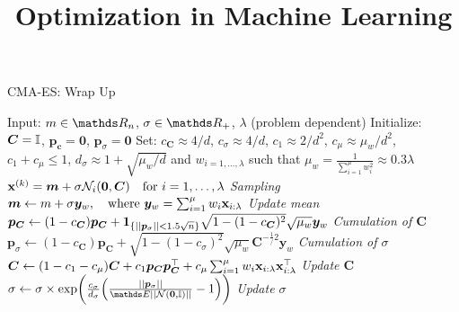 \documentclass[11pt,compress,t,notes=noshow, xcolor=table]{beamer}
\title{Optimization in Machine Learning}
\date{}
\begin{document}
\sloppy


\begin{vbframe}{CMA-ES: Wrap Up}

\begin{algorithm}[H]
  \begin{footnotesize}
  \begin{center}
  \caption{CMA-ES}
    \begin{algorithmic}[1]
    \State Input: $m \in \R_n$, $\sigma \in \R_+$, $\lambda$ (problem dependent)
    \State Initialize: $\bm{C} = \bm{\mathbb{I}}$, $\bm{p}_{\bm{c}} = \bm{0}$, $\bm{p}_{\sigma} = \bm{0}$
    \State Set: $c_{\bm{C}} \approx 4/d$, $c_{\sigma} \approx 4/d$, $c_1 \approx 2/d^2$, $c_{\mu} \approx \mu_w/d^2$, $c_1+c_{\mu} \leq 1$, $d_{\sigma} \approx 1+\sqrt{\mu_w/d}$ and $w_{i=1,\dots, \lambda}$ such that $\mu_w = \frac{1}{\sum_{i=1}^{\mu} w_i^2} \approx 0.3 \lambda$
      \State $\mathbf{x}^{(k)} = \bm{m} + \sigma \mathcal{N}_i(\bm{0}, \bm{C}) \quad \text{for } i=1,\dots, \lambda$ \quad \textit{Sampling}
      \State $\bm{m} \leftarrow m + \sigma \bm{y}_w, \quad \text{where } \bm{y}_w = \sum_{i=1}^{\mu} w_i \mathbf{x}_{i:\lambda}$ \quad \textit{Update mean}
      \State $\bm{p}_{\bm{C}} \leftarrow (1-c_{\bm{C}})\bm{p}_{\bm{C}} + \boldsymbol{1}_{\{||\bm{p}_{\sigma}|| < 1.5\sqrt{n}\}}\sqrt{1-(1-c_{\bm{C}})^2} \sqrt{\mu_w} \bm{y}_w$ \quad \textit{Cumulation of $\bm{C}$}
      \State $\bm{p}_{\sigma} \leftarrow (1-c_{\bm{C}})\bm{p}_{\bm{C}} + \sqrt{1-(1-c_{\sigma})^2} \sqrt{\mu_w} \bm{C}^{-\frac{1}/{2}} \bm{y}_w$ \quad \textit{Cumulation of $\sigma$}
      \State $\bm{C} \leftarrow (1-c_1-c_{\mu}) \bm{C} + c_1 \bm{p}_{\bm{C}} \bm{p}_{\bm{C}}^\top + c_{\mu} \sum_{i=1}^{\mu} w_i \mathbf{x}_{i:\lambda} \mathbf{x}_{i:\lambda}^\top$ \quad \textit{Update $\bm{C}$}
      \State $\sigma \leftarrow \sigma \times \exp\biggl( \frac{c_\sigma}{d_\sigma}\Bigl(\frac{||\bm{p}_\sigma||}{\E||\normal(\bm{0}, \bm{\I})||} - 1 \Bigl)\biggl)$ \quad \textit{Update $\sigma$}
    \EndWhile
    \end{algorithmic}
    \end{center}
    \end{footnotesize}
\end{algorithm}


\end{vbframe}
\end{document}
